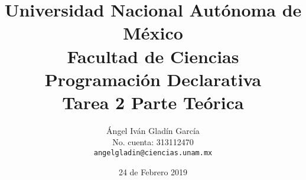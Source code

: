 \documentclass[11pt,letterpaper]{article}
\begin{document}
\title{
        Universidad Nacional Autónoma de México\\
        Facultad de Ciencias\\
        Programación Declarativa\\
    \vspace{.5cm}
    \large
        \textbf{Tarea 2} Parte Teórica
}
\author{
    Ángel Iván Gladín García\\
    No. cuenta: 313112470\\
    \texttt{angelgladin@ciencias.unam.mx}
}
\date{24 de Febrero 2019}
\maketitle

\newtheorem{theorem}{Teorema}
\newtheorem{example}{Ejemplo}
\newtheorem{corollary}{Corolario}
\newtheorem{lemma}{Lemma}
\newtheorem{definition}{Definicion}
\newtheorem{prop}{Proposicion}
\end{document}
